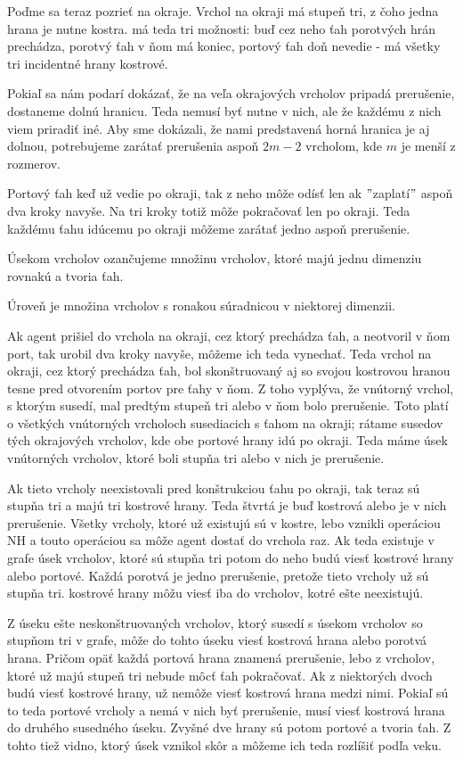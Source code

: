 Poďme sa teraz pozrieť na okraje. Vrchol na okraji má stupeň tri, z čoho jedna
hrana je nutne kostra. má teda tri možnosti: buď cez neho ťah porotvých hrán
prechádza, porotvý ťah v ňom má koniec, portový ťah doň nevedie - má všetky
tri incidentné hrany kostrové.

Pokiaľ sa nám podarí dokázať, že na veľa okrajových vrcholov pripadá
prerušenie, dostaneme dolnú hranicu. Teda nemusí byť nutne v nich, ale že 
každému z nich viem priradiť iné. Aby sme dokázali, že nami predstavená
horná hranica je aj dolnou, potrebujeme zarátať prerušenia aspoň $2m - 2$
vrcholom, kde $m$ je menší z rozmerov.

Portový ťah keď už vedie po okraji, tak z neho môže odísť len ak
$"$zaplatí$"$ aspoň dva kroky navyše. Na tri kroky totiž môže pokračovať len
po okraji. Teda každému ťahu idúcemu po okraji môžeme zarátať jedno aspoň
prerušenie.

\begin{ozn}
Úsekom vrcholov ozančujeme množinu vrcholov, ktoré majú jednu dimenziu
rovnakú a tvoria ťah.

Úroveň je množina vrcholov s ronakou súradnicou v niektorej dimenzii.
\end{ozn}

Ak agent prišiel do vrchola na okraji, cez ktorý prechádza ťah, a neotvoril
v ňom port, tak urobil dva kroky navyše, môžeme ich teda vynechať. Teda vrchol
na okraji, cez ktorý prechádza ťah, bol skonštruovaný aj so svojou kostrovou 
hranou tesne pred otvorením portov pre ťahy v ňom. Z toho vyplýva, že
vnútorný vrchol, s ktorým susedí, mal predtým stupeň tri alebo v ňom bolo
prerušenie. Toto platí o všetkých vnútorných vrcholoch susediacich s ťahom
na okraji; rátame susedov tých okrajových vrcholov, kde obe portové hrany
idú po okraji. Teda máme úsek vnútorných vrcholov, ktoré boli stupňa tri
alebo v nich je prerušenie.


Ak tieto vrcholy neexistovali pred konštrukciou
ťahu po okraji, tak teraz sú stupňa tri a majú tri kostrové hrany. Teda
štvrtá je buď kostrová alebo je v nich prerušenie.
Všetky vrcholy, ktoré už existujú sú v kostre, lebo vznikli operáciou NH a
touto operáciou sa môže agent dostať do vrchola raz. Ak teda existuje v
grafe úsek
vrcholov, ktoré sú stupňa tri potom do neho budú viesť kostrové hrany alebo
portové. Každá porotvá je jedno prerušenie, pretože tieto vrcholy už sú
stupňa tri. kostrové hrany môžu viesť iba do vrcholov, kotré ešte
neexistujú.

Z úseku ešte neskonštruovaných vrcholov, ktorý susedí s úsekom vrcholov so
stupňom tri v grafe, môže do tohto úseku viesť kostrová hrana alebo porotvá
hrana. Pričom opäť každá portová hrana znamená prerušenie, lebo z vrcholov,
ktoré už majú stupeň tri nebude môcť ťah pokračovať. Ak z niektorých dvoch
budú viesť kostrové hrany, už nemôže viesť kostrová hrana medzi nimi. Pokiaľ
sú to teda portové vrcholy a nemá v nich byť prerušenie, musí viesť kostrová
hrana do druhého susedného úseku. Zvyšné dve hrany sú potom portové a tvoria
ťah. Z tohto tiež vidno, ktorý úsek vznikol skôr a môžeme ich teda rozlíšiť
podľa veku.

